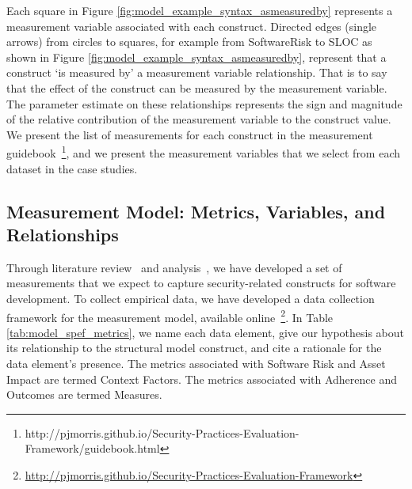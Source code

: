 Each square in Figure \ref{fig:model_example_syntax_asmeasuredby} represents a measurement variable associated with each construct. Directed edges (single arrows) from circles to squares, for example from SoftwareRisk to SLOC as shown in Figure \ref{fig:model_example_syntax_asmeasuredby}, represent that a construct `is measured by' a measurement variable relationship. That is to say that the effect of the construct can be measured by the measurement variable. The parameter estimate on these relationships represents the sign and magnitude of the relative contribution of the measurement variable to the construct value. We present the list of measurements for each construct in the measurement guidebook~\footnote{http://pjmorris.github.io/Security-Practices-Evaluation-Framework/guidebook.html}, and we present the measurement variables that we select from each dataset in the case studies. 

\subsection{Measurement Model: Metrics, Variables, and Relationships}
\label{sec:model_measurement}
Through literature review~\cite{morrison2014mapping} and analysis~\cite{morrison2017surveying,morrison2017measuring}, we have developed a set of measurements that we expect to capture security-related constructs for software development. To collect empirical data, we have developed a data collection framework for the measurement model, available online~\footnote{\url{http://pjmorris.github.io/Security-Practices-Evaluation-Framework}}. In Table \ref{tab:model_spef_metrics}, we name each data element, give our hypothesis about its relationship to the structural model construct, and cite a rationale for the data element's presence. The metrics associated with Software Risk and Asset Impact are termed Context Factors. The metrics associated with Adherence and Outcomes are termed Measures. 
		
